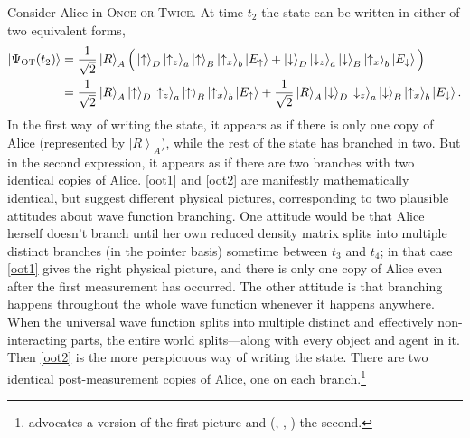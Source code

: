 \documentclass[onecolumn,secnumarabic,amsmath,amssymb,balancelastpage,nofootinbib]{article}
\newcommand{\ket}[1]{\ensuremath{\left|#1\right\rangle}}
\begin{document}
Consider Alice in \textsc{Once-or-Twice}. At time $t_2$ the state can be written in either of two equivalent forms,
\begin{align}
\ket{\Psi_{\textsc{OT}}(t_2)}&=\frac{1}{\sqrt{2}}\ket{R}_A\Big(\ket{\uparrow}_{D}\ket{\uparrow_z}_a\ket{\uparrow}_B\ket{\uparrow_x}_b\ket{E_{\uparrow}}+\ket{\downarrow}_{D}\ket{\downarrow_z}_a\ket{\downarrow}_B\ket{\uparrow_x}_b\ket{E_{\downarrow}}\Big)
\label{oot1}
\\
&=\frac{1}{\sqrt{2}}\ket{R}_A\ket{\uparrow}_{D}\ket{\uparrow_z}_a\ket{\uparrow}_B\ket{\uparrow_x}_b\ket{E_{\uparrow}}+\frac{1}{\sqrt{2}}\ket{R}_A\ket{\downarrow}_{D}\ket{\downarrow_z}_a\ket{\downarrow}_B\ket{\uparrow_x}_b\ket{E_{\downarrow}}.
\label{oot2}
\end{align}
In the first way of writing the state, it appears as if there is only one copy of Alice (represented by $\ket{R}_A$), while the rest of the state has branched in two. But in the second expression, it appears as if there are two branches with two identical copies of Alice. \eqref{oot1} and \eqref{oot2} are manifestly mathematically identical, but suggest different physical pictures, corresponding to two plausible attitudes about wave function branching. One attitude would be that Alice herself doesn't branch until her own reduced density matrix splits into multiple distinct branches (in the pointer basis) sometime between $t_3$ and $t_4$; in that case \eqref{oot1} gives the right physical picture, and there is only one copy of Alice even after the first measurement has occurred. The other attitude is that branching happens throughout the whole wave function whenever it happens anywhere.  When the universal wave function splits into multiple distinct and effectively non-interacting parts, the entire world splits---along with every object and agent in it. Then \eqref{oot2} is the more perspicuous way of writing the state.  There are two identical post-measurement copies of Alice, one on each branch.\footnote{\citet[]{wallace2012} advocates a version of the first picture and \citeauthor{vaidman2014} (\citeyear{vaidman2014}, \citeyear{vaidmanSEP}, \citeyear{vaidman2015}) the second.}
\end{document}
